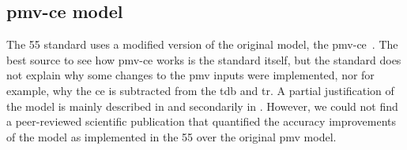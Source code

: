 \subsection{\ac{pmv-ce} model}\label{subsec:pmv-ce-limitations}
The \gls{55} standard uses a modified version of the original model, the \ac{pmv-ce}~\cite{ashrae552023}.
The best source to see how \ac{pmv-ce} works is the standard itself, but the standard does not explain why some changes to the \ac{pmv} inputs were implemented, nor for example, why the \ac{ce} is subtracted from the \ac{tdb} and \ac{tr}.
A partial justification of the model is mainly described in  and secondarily in .
However, we could not find a peer-reviewed scientific publication that quantified the accuracy improvements of the model as implemented in the \gls{55} over the original \ac{pmv} model.

